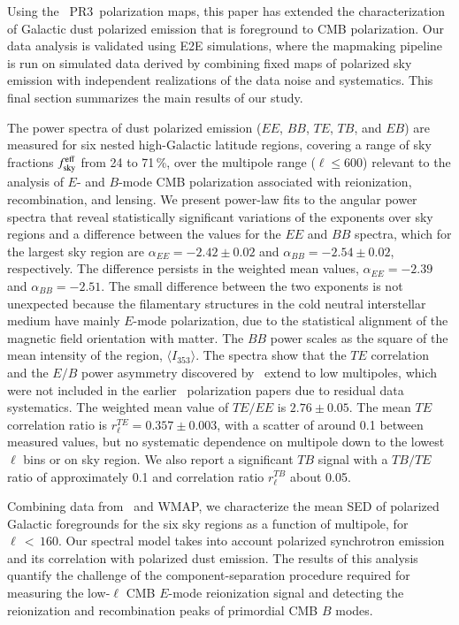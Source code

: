 \documentclass[longauth,traditabstract]{aa}
\newcommand{\WMAP}{WMAP}
\newcommand{\feff}{f_{\rm sky}^{\rm eff}}
\newcommand{\PR}{PR3}
\newcommand{\ainten}{\langle I_{353}\rangle} %
\newcommand{\valpee}{-2.42} %
\newcommand{\valpeeu}{0.02} %
\newcommand{\valpbb}{-2.54} %
\newcommand{\valpbbu}{0.02} %
\newcommand{\mvalpee}{-2.39} %
\newcommand{\mvalpbb}{-2.51} %
\begin{document}
Using the \Planck\ \PR\ polarization maps, this paper has extended the characterization of
Galactic dust polarized emission that is foreground to CMB polarization.  Our data analysis 
is validated using E2E simulations, where the mapmaking pipeline is run on simulated data derived by combining fixed maps of polarized sky emission with independent realizations
of the data noise and systematics. This final section summarizes the main results of our study.

The power spectra of dust polarized emission ($EE$, $BB$, $TE$, $TB$, and $EB$) are measured for six nested high-Galactic latitude regions, covering a range of sky fractions $\feff$ from 
24 to 71\,\%, over the multipole range ($\ell \le 600$) relevant to the analysis of $E$- and $B$-mode CMB polarization associated with 
reionization, recombination, and lensing.
We present power-law fits to the angular power spectra that reveal
statistically significant variations of the exponents over sky regions and a difference between the values for the $EE$ and $BB$ spectra, which for the largest sky region are
$\alpha_{EE} = \valpee\pm\valpeeu$ and $\alpha_{BB} = \valpbb\pm\valpbbu$, respectively.
%
The difference persists in the weighted mean values,
$\alpha_{EE} = \mvalpee$ and $\alpha_{BB} = \mvalpbb$. 
The small difference between the two exponents is not unexpected because 
the filamentary structures in the cold neutral interstellar medium have mainly $E$-mode polarization, due to the 
statistical alignment of the magnetic field orientation with matter.
The $BB$ power scales as the square of the mean intensity of the region, $\ainten$.
The spectra show that the $TE$ correlation and the $E/B$ power asymmetry discovered by \Planck\ extend to low multipoles, which were not included in the
earlier \Planck\ polarization papers due to residual data systematics. 
The weighted mean value of $TE/EE$ is $2.76\pm0.05$.
The mean $TE$ correlation ratio is $r^{TE}_\ell = 0.357\pm0.003$,
with a scatter of around 0.1 between measured values, but no systematic dependence on multipole down to the lowest $\ell$ bins or on sky region.
We also report a significant $TB$ signal with 
a $TB/TE$ ratio of approximately 0.1 and correlation ratio $r^{TB}_\ell$ about 0.05.

Combining data from \Planck\ and \WMAP, we characterize the mean SED of polarized Galactic foregrounds 
for the six sky regions as a function of multipole, for $\ell\,{<}\,160$. 
Our spectral model takes into account polarized synchrotron emission and its correlation with polarized dust emission.
The results of this analysis quantify the challenge of the component-separation procedure required for measuring the low-$\ell$ CMB $E$-mode reionization signal and detecting 
the reionization and recombination peaks of primordial CMB $B$ modes.
\end{document}
